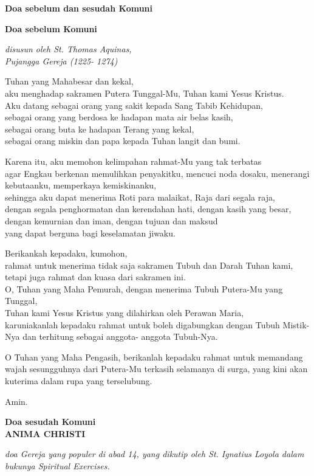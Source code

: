 \documentclass[a5paper,headsepline,titlepage,10pt,nnormalheadings,DIVcalc]{scrbook}
\makeatletter
\newcommand{\judul}[1]{%
  {\parindent \z@ \centering 
    \interlinepenalty\@M \Large \bfseries #1\par\nobreak \vskip 20\p@ }}
\newcommand{\subjudul}[1]{%
  {\parindent \z@ 
    \interlinepenalty\@M \bfseries #1\par\nobreak \vskip 5\p@ }}
\newcommand{\keterangan}[1]{%
  {\parindent \z@  \slshape 
    \interlinepenalty\@M \vskip -7\p@ \scriptsize \textsl{#1}\par\nobreak  \vskip 5\p@}}
\makeatother
\begin{document}
\judul{Doa sebelum dan sesudah Komuni}
\subjudul{Doa sebelum Komuni}
\keterangan{disusun oleh St. Thomas Aquinas,\\ Pujangga Gereja (1225- 1274)}

Tuhan yang Mahabesar dan kekal,\\
aku menghadap sakramen Putera Tunggal-Mu, Tuhan kami Yesus Kristus.\\
Aku datang sebagai orang yang sakit kepada Sang Tabib Kehidupan,\\
sebagai orang yang berdosa ke hadapan mata air belas kasih,\\
sebagai orang buta ke hadapan Terang yang kekal,\\
sebagai orang miskin dan papa kepada Tuhan langit dan bumi.

Karena itu, aku memohon kelimpahan rahmat-Mu yang tak terbatas\\
agar Engkau berkenan memulihkan penyakitku, mencuci noda dosaku, menerangi kebutaanku, memperkaya kemiskinanku,\\
sehingga aku dapat menerima Roti para malaikat, Raja dari segala raja,\\
dengan segala penghormatan dan kerendahan hati, dengan kasih yang besar,\\
dengan kemurnian dan iman, dengan tujuan dan maksud\\
yang dapat berguna bagi keselamatan jiwaku.

Berikankah kepadaku, kumohon,\\
rahmat untuk menerima tidak saja sakramen Tubuh dan Darah Tuhan kami,\\
tetapi juga rahmat dan kuasa dari sakramen ini.\\
O, Tuhan yang Maha Pemurah, dengan menerima Tubuh Putera-Mu yang Tunggal,\\
Tuhan kami Yesus Kristus yang dilahirkan oleh Perawan Maria,\\
karuniakanlah kepadaku rahmat untuk boleh digabungkan dengan Tubuh Mistik-Nya dan terhitung sebagai anggota- anggota Tubuh-Nya.

O Tuhan yang Maha Pengasih, berikanlah kepadaku rahmat untuk memandang wajah sesungguhnya dari Putera-Mu terkasih selamanya di surga, yang kini akan kuterima dalam rupa yang terselubung.

Amin.

\subjudul{Doa sesudah Komuni\\ANIMA CHRISTI}
\keterangan{doa Gereja yang populer di abad 14, yang dikutip oleh St. Ignatius Loyola dalam bukunya Spiritual Exercises.}
\end{document}
